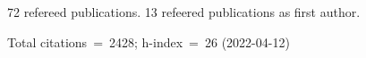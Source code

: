 72 refereed publications. 13 refeered publications as first author.

Total citations~=~2428; h-index~=~26 (2022-04-12)